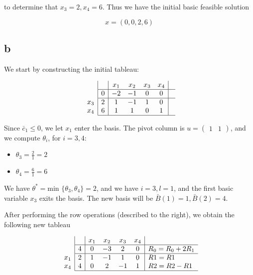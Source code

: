 \documentclass[11pt,a4paper]{article}
\begin{document}
to determine that $x_3=2, x_4=6$. Thus we have the initial basic feasible solution

$$
x=(0,0,2,6)
$$

\subsection{b}

We start by constructing the initial tableau:

$$
\begin{array}{c}
\\
 \\
x_3 \\
x_4 \\ 
\end{array}
\begin{array}{|c|cccc|c}
    & x_1 & x_2 & x_3 & x_4 &  \\ \hline
  0 & -2 & -1 & 0 & 0 & \\ \hline
  2 & 1 & -1 & 1 & 0 & \\
  6 & 1 & 1 & 0 & 1 & \\\hline
\end{array}
$$

Since $\bar{c}_1\leq 0$, we let $x_1$ enter the basis. The pivot column is $u=\begin{pmatrix}1 & 1\end{pmatrix}$, and we compute $\theta_i$, for $i=3,4$:

\begin{itemize}
\item $\theta_3=\frac{2}{1}=2$
\item $\theta_4=\frac{6}{1}=6$
\end{itemize}

We have $\theta^*=\text{min }\{\theta_3, \theta_4\}=2$, and we have $i=3, l=1$, and the first basic variable $x_3$ exits the basis. The new basis will be $\bar{B}(1)=1, \bar{B}(2)=4$.

After performing the row operations (described to the right), we obtain the following new tableau

$$
\begin{array}{c}
\\
 \\
x_1 \\
x_4 \\ 
\end{array}
\begin{array}{|c|cccc|l}
    & x_1 & x_2 & x_3 & x_4 & \\ \hline
  4 & 0 & -3 & 2 & 0 & R_0=R_0+2R_1 \\  \hline
  2 & 1 & -1 & 1 & 0 & R1=R1\\
  4 & 0 & 2 & -1 & 1 & R2 = R2 - R1\\\hline
\end{array}
$$
\end{document}
